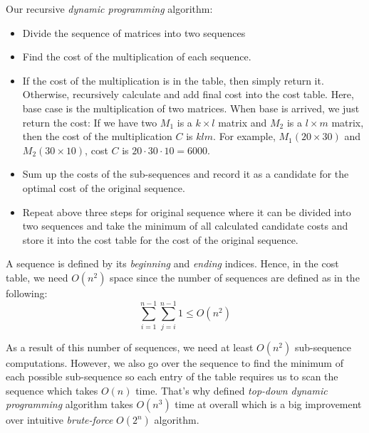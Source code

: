 Our recursive \textit{dynamic programming} algorithm:
\begin{itemize}
  \item Divide the sequence of matrices into two sequences
  \item Find the cost of the multiplication of each sequence.  
  \item If the cost of the multiplication is in the table, then simply return it. Otherwise, recursively calculate and add final cost into the cost table. Here, base case is  the multiplication of two matrices. When base is arrived, we just return the cost: If we have two $M_1$ is a $k \times l$ matrix and $M_2$ is a  $l \times m$ matrix, then the cost of the multiplication $C$ is $klm$. For example, $M_1(20 \times 30)$ and $M_2(30 \times 10)$, cost $C$ is $20 \cdot 30 \cdot 10 = 6000$.
  \item Sum up the costs of the sub-sequences and record it as a candidate for the optimal cost of the original sequence.
  \item Repeat above three steps for original sequence where it can be divided into two sequences and take the minimum of all calculated candidate costs and store it into the cost table for the cost of the original sequence.
\end{itemize}

A sequence is defined by its \textit{beginning} and \textit{ending} indices. Hence, in the cost table, we need $O(n^2)$ space since the number of sequences are defined as in the following:
$$
  \sum_{i=1}^{n-1}{\sum_{j=i}^{n-1} 1} \leq O(n^2)
$$

As a result of this number of sequences, we need at least $O(n^2)$ sub-sequence computations. However, we also go over the sequence to find the minimum of each possible sub-sequence so each entry of the table requires us to scan the sequence which takes $O(n)$ time. That's why defined \textit{top-down dynamic programming} algorithm takes $O(n^3)$ time at overall which is a big improvement over intuitive \textit{brute-force} $O(2^n)$ algorithm.